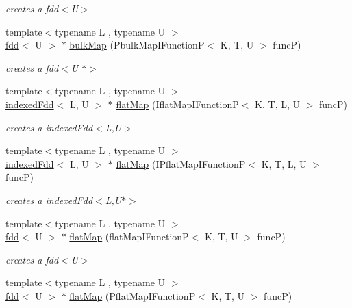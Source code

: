 \begin{DoxyCompactItemize}
\begin{DoxyCompactList}\small\item\em creates a fdd$<$\+U$>$ \end{DoxyCompactList}\item 
{\footnotesize template$<$typename L , typename U $>$ }\\\hyperlink{classfaster_1_1fdd}{fdd}$<$ U $>$ $\ast$ \hyperlink{group__bulk_ga73ba7acbff0aabd4e8f92d07c3920d3a}{bulk\+Map} (Pbulk\+Map\+I\+FunctionP$<$ K, T, U $>$ funcP)
\begin{DoxyCompactList}\small\item\em creates a fdd$<$\+U $\ast$$>$ \end{DoxyCompactList}\item 
{\footnotesize template$<$typename L , typename U $>$ }\\\hyperlink{classfaster_1_1indexedFdd}{indexed\+Fdd}$<$ L, U $>$ $\ast$ \hyperlink{group__flatmap_ga9c104d832a84dc9f3f648db7c0ea1374}{flat\+Map} (Iflat\+Map\+I\+FunctionP$<$ K, T, L, U $>$ funcP)
\begin{DoxyCompactList}\small\item\em creates a indexed\+Fdd$<$\+L,\+U$>$ \end{DoxyCompactList}\item 
{\footnotesize template$<$typename L , typename U $>$ }\\\hyperlink{classfaster_1_1indexedFdd}{indexed\+Fdd}$<$ L, U $>$ $\ast$ \hyperlink{group__flatmap_gafe4a7200c3b0adfe13d9479b2e89d015}{flat\+Map} (I\+Pflat\+Map\+I\+FunctionP$<$ K, T, L, U $>$ funcP)
\begin{DoxyCompactList}\small\item\em creates a indexed\+Fdd$<$\+L,\+U$\ast$$>$ \end{DoxyCompactList}\item 
{\footnotesize template$<$typename L , typename U $>$ }\\\hyperlink{classfaster_1_1fdd}{fdd}$<$ U $>$ $\ast$ \hyperlink{group__flatmap_gac43ac811a8e6341d835990da6d43e422}{flat\+Map} (flat\+Map\+I\+FunctionP$<$ K, T, U $>$ funcP)
\begin{DoxyCompactList}\small\item\em creates a fdd$<$\+U$>$ \end{DoxyCompactList}\item 
{\footnotesize template$<$typename L , typename U $>$ }\\\hyperlink{classfaster_1_1fdd}{fdd}$<$ U $>$ $\ast$ \hyperlink{group__flatmap_gaa97f249971caca71c70a03bb170b3829}{flat\+Map} (Pflat\+Map\+I\+FunctionP$<$ K, T, U $>$ funcP)

\end{DoxyCompactItemize}
